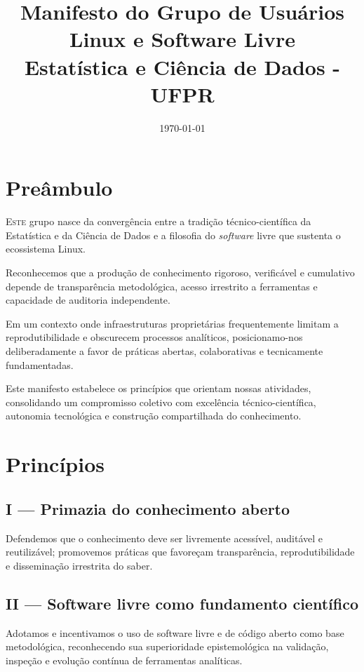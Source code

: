 \documentclass[
  12pt,          %
  a4paper,       %
  oneside,       %
  brazil         %
]{article}
\title{Manifesto do Grupo de Usuários Linux e Software Livre\\Estatística e Ciência de Dados - UFPR}
\date{\today}
\newenvironment{principio}[1]{%
  \vspace{0.8em}
  \noindent
  \begin{minipage}{\textwidth}
    \subsection*{#1}
    \itshape
}{%
  \end{minipage}
  \vspace{0.5em}
}
\begin{document}
\thispagestyle{empty}
\maketitle

\newpage

\section*{Preâmbulo}

\lettrine[lines=3, lhang=0.1, nindent=0em, slope=-0.5em]{E}{ste} grupo nasce da convergência entre a tradição técnico-científica da Estatística e da 
Ciência de Dados e a filosofia do \textit{software} livre que sustenta o ecossistema Linux.

Reconhecemos que a produção de conhecimento rigoroso, verificável e cumulativo depende de transparência metodológica, acesso irrestrito a 
ferramentas e capacidade de auditoria independente.

Em um contexto onde infraestruturas proprietárias frequentemente limitam a reprodutibilidade e obscurecem processos analíticos, 
posicionamo-nos deliberadamente a favor de práticas abertas, colaborativas e tecnicamente fundamentadas.

Este manifesto estabelece os princípios que orientam nossas atividades, consolidando um compromisso coletivo com excelência técnico-científica, 
autonomia tecnológica e construção compartilhada do conhecimento.

\section*{Princípios}

\begin{principio}{I --- Primazia do conhecimento aberto}
Defendemos que o conhecimento deve ser livremente acessível, auditável e reutilizável; promovemos práticas que favoreçam 
transparência, reprodutibilidade e disseminação irrestrita do saber.
\end{principio}

\begin{principio}{II --- Software livre como fundamento científico}
Adotamos e incentivamos o uso de software livre e de código aberto como base metodológica, reconhecendo sua superioridade epistemológica na 
validação, inspeção e evolução contínua de ferramentas analíticas.
\end{principio}
\end{document}
